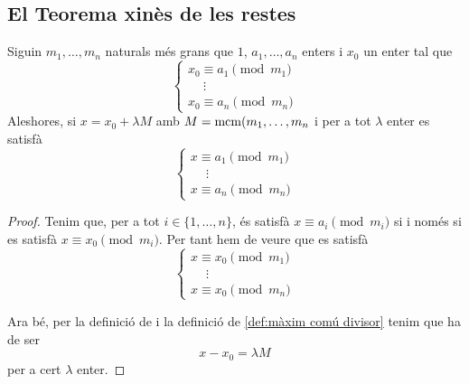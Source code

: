 \documentclass[../Apunts.tex]{subfiles}
\begin{document}
	\subsection{El Teorema xinès de les restes}
	\begin{lemma}
		\label{lemma:thm:Teorema xinès de les restes}
		Siguin \(m_{1},\dots,m_{n}\) naturals més grans que \(1\), \(a_{1},\dots,a_{n}\) enters i \(x_{0}\) un enter tal que
		\[\begin{cases}
			x_{0}\equiv a_{1}\pmod{m_{1}}\\
			\quad\ \vdots\\
			x_{0}\equiv a_{n}\pmod{m_{n}}
		\end{cases}\]
		Aleshores, si \(x=x_{0}+\lambda M\) amb \(M=\operatorname{mcm}(m_{1},\dots,m_{n}\) i per a tot \(\lambda\) enter es satisfà
		\[\begin{cases}
		x\equiv a_{1}\pmod{m_{1}}\\
		\quad\ \vdots\\
		x\equiv a_{n}\pmod{m_{n}}
		\end{cases}\]
		\begin{proof}
			Tenim que, per a tot \(i\in\{1,\dots,n\}\), és satisfà \(x\equiv a_{i}\pmod{m_{i}}\) si i només si es satisfà \(x\equiv x_{0}\pmod{m_{i}}\). Per tant hem de veure que es satisfà
			\[\begin{cases}
			x\equiv x_{0}\pmod{m_{1}}\\
			\quad\ \vdots\\
			x\equiv x_{0}\pmod{m_{n}}
			\end{cases}\]
			
			Ara bé, per la definició de  i la definició de \ref{def:màxim comú divisor} tenim que ha de ser
			\[x-x_{0}=\lambda M\]
			per a cert \(\lambda\) enter.
		\end{proof}
	\end{lemma}
\end{document}
